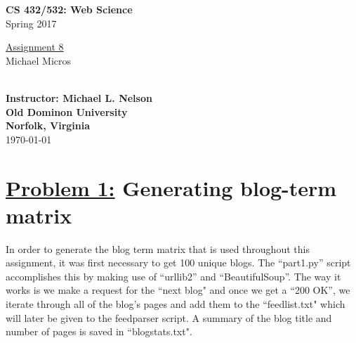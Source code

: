 \documentclass{article}
\begin{document}

\begin{titlepage}

\vspace*{45 pt}
\begin{center}
\Huge{\bf CS 432/532:  Web Science}\\
\huge{Spring 2017\\}

\vspace{60 pt}
\Huge\underline {Assignment 8}\\

\vspace{10 pt}
\Huge{Michael Micros}\\\

{\Large \bf {Instructor: Michael L. Nelson}}\\

\vspace{230 pt}
{\huge \bf {Old Dominon University}}\\
{\huge \bf {Norfolk, Virginia}}\\

\vspace{10 pt}
\today

\end{center}
\end{titlepage}





\section*{{\underline{\huge {Problem 1:}} Generating blog-term matrix  }}
In order to generate the blog term matrix that is used throughout this assignment, it was first necessary to get 100 unique blogs. The ``part1.py'' script accomplishes this by making use of ``urllib2'' and ``BeautifulSoup''. The way it works is we make a request for the ``next blog" and once we get a ``200 OK'', we iterate through all of the blog's pages and add them to the ``feedlist.txt" which will later be given to the feedparser script. A summary of the blog title and number of pages is saved in ``blogstats.txt".
\end{document}
